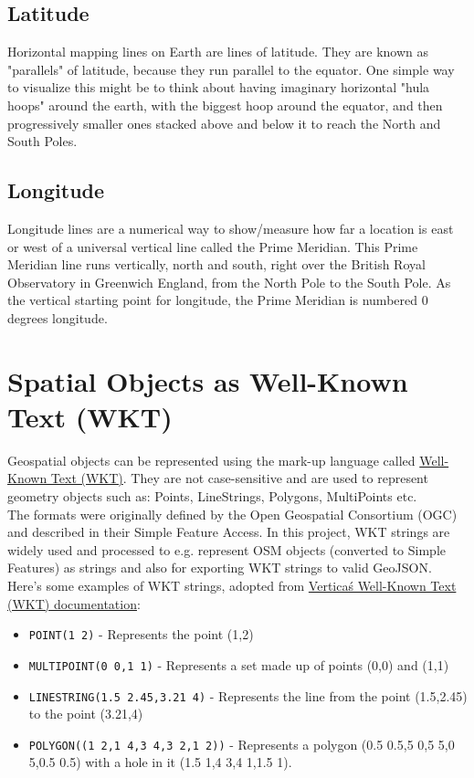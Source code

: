 \subsection{Latitude}
Horizontal mapping lines on Earth are lines of latitude.
They are known as "parallels" of latitude, because they run parallel to the equator.
One simple way to visualize this might be to think about having imaginary horizontal "hula hoops" around the earth,
with the biggest hoop around the equator, and then progressively smaller ones stacked above and
below it to reach the North and South Poles. \cite{JourneyNorthLatitudeLongitude}
\subsection{Longitude}
Longitude lines are a numerical way to show/measure how far a location is east or west of a universal vertical line called the
Prime Meridian.
This Prime Meridian line runs vertically, north and south, right over the British Royal Observatory in
Greenwich England, from the North Pole to the South Pole.
As the vertical starting point for longitude, the Prime Meridian is numbered 0 degrees longitude. \cite{JourneyNorthLatitudeLongitude}
\section{Spatial Objects as Well-Known Text (WKT)}
Geospatial objects can be represented using the mark-up language called \href{https://www.ogc.org/standards/wkt-crs}{Well-Known Text (WKT)}.
They are not case-sensitive and are used to represent geometry objects such as: Points, LineStrings, Polygons, MultiPoints etc.\\
\newline
The formats were originally defined by the Open Geospatial Consortium (OGC) and described in their Simple Feature Access.
In this project, WKT strings are widely used and processed to e.g. represent OSM objects (converted to Simple Features) as strings and also for exporting
WKT strings to valid GeoJSON. \cite{OGCWKT}\\
\newline
Here's some examples of WKT strings, adopted from \href{https://www.vertica.com/docs/9.3.x/HTML/Content/Authoring/AnalyzingData/Geospatial/Spatial_Definitions/WellknownTextWKT.htm}{Vertica\'s Well-Known Text (WKT) documentation}: \cite{VerticaWKT}
\begin{itemize}
    \item \texttt{POINT(1 2)} - Represents the point (1,2)
    \item \texttt{MULTIPOINT(0 0,1 1)} - Represents a set made up of points (0,0) and (1,1)
    \item \texttt{LINESTRING(1.5 2.45,3.21 4)} - Represents the line from the point (1.5,2.45) to the point (3.21,4)
    \item \texttt{POLYGON((1 2,1 4,3 4,3 2,1 2))} - Represents a polygon (0.5 0.5,5 0,5 5,0 5,0.5 0.5) with a hole in it (1.5 1,4 3,4 1,1.5 1).
\end{itemize}

